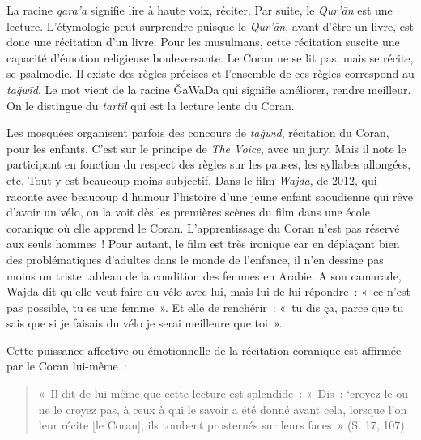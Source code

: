 La racine \emph{qara'a} signifie lire à haute voix, réciter. Par suite,
le \emph{Qur'ān} est une lecture. L'étymologie peut surprendre puisque
le \emph{Qur'ān}, avant d'être un livre, est donc une récitation d'un
livre. Pour les musulmans, cette récitation suscite une capacité
d'émotion religieuse bouleversante. Le Coran ne se lit pas, mais se
récite, se psalmodie. Il existe des règles précises et l'ensemble de ces
règles correspond au \emph{taǧwīd}. Le mot vient de la racine ǦaWaDa qui
signifie améliorer, rendre meilleur. On le distingue du \emph{tartīl}
qui est la lecture lente du Coran.

Les mosquées organisent parfois des concours de \emph{taǧwīd},
récitation du Coran, pour les enfants. C'est sur le principe de
\emph{The Voice}, avec un jury. Mais il note le participant en fonction
du respect des règles sur les pauses, les syllabes allongées, etc. Tout
y est beaucoup moins subjectif. Dans le film \emph{Wajda}, de 2012, qui
raconte avec beaucoup d'humour l'histoire d'une jeune enfant saoudienne
qui rêve d'avoir un vélo, on la voit dès les premières scènes du film
dans une école coranique où elle apprend le Coran. L'apprentissage du
Coran n'est pas réservé aux seuls hommes~! Pour autant, le film est très
ironique car en déplaçant bien des problématiques d'adultes dans le
monde de l'enfance, il n'en dessine pas moins un triste tableau de la
condition des femmes en Arabie. A son camarade, Wajda dit qu'elle veut
faire du vélo avec lui, mais lui de lui répondre~: «~ce n'est pas
possible, tu es une femme~». Et elle de renchérir~: «~tu dis ça, parce
que tu sais que si je faisais du vélo je serai meilleure que toi~».



Cette puissance affective ou émotionnelle de la récitation coranique est
affirmée par le Coran lui-même~:
\begin{quote}
    
«~Il dit de lui-même que cette lecture est splendide~: «~Dis~:
`croyez-le ou ne le croyez pas, à ceux à qui le savoir a été donné avant
cela, lorsque l'on leur récite {[}le Coran{]}, ils tombent prosternés
sur leurs faces~» (S. 17, 107).


\end{quote}

